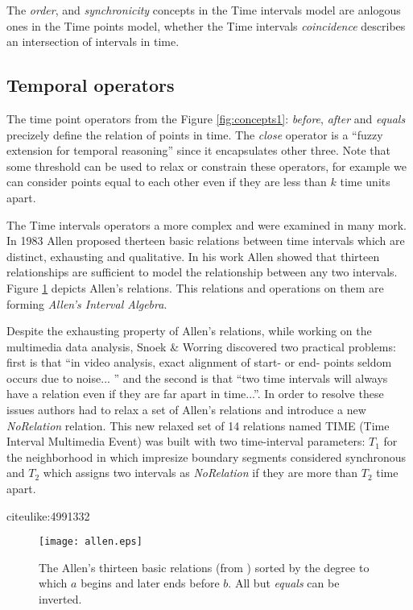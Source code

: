 The \textit{order}, and \textit{synchronicity} concepts in the Time intervals model are anlogous ones in the Time points model, whether the Time intervals \textit{coincidence} describes an intersection of intervals in time.

\subsection{Temporal operators} \label{tconcepts_opertaors}
The time point operators from the Figure \ref{fig:concepts1}: \textit{before}, \textit{after} and \textit{equals} precizely define the relation of points in time. The \textit{close} operator is a ``fuzzy extension for temporal reasoning'' since it encapsulates other three. Note that some threshold can be used to relax or constrain these operators, for example we can consider points equal to each other even if they are less than $k$ time units apart.

The Time intervals operators a more complex and were examined in many mork. In 1983 Allen \cite{citeulike:191348} proposed therteen basic relations between time intervals which are distinct, exhausting and qualitative. In his work Allen showed that thirteen relationships are sufficient to model the relationship between any two intervals. Figure \ref{fig:allen} depicts Allen's relations. This relations and operations on them are forming \textit{Allen's Interval Algebra}.

Despite the exhausting property of Allen's relations, while working on the multimedia data analysis, Snoek \& Worring \cite{citeulike:272197} discovered two practical problems: first is that ``in video analysis, exact alignment of start- or end- points seldom occurs due to noise... '' and the second is that ``two time intervals will always have a relation even if they are far apart in time...''. In order to resolve these issues authors had to relax a set of Allen's relations and introduce a new \textit{NoRelation} relation. This new relaxed set of 14 relations named TIME (Time Interval Multimedia Event) was built with two time-interval parameters: $T_{1}$ for the neighborhood in which impresize boundary segments considered synchronous and $T_{2}$ which assigns two intervals as \textit{NoRelation} if they are more than $T_{2}$ time apart.

citeulike:4991332

\begin{figure}[tbp]
   \centering
   \texttt{[image: allen.eps]}
   \caption{The Allen's thirteen basic relations (from \cite{citeulike:4072008}) sorted by the degree to which $a$ begins and later ends before $b$. All but \textit{equals} can be inverted.}
   \label{fig:allen}
\end{figure}

